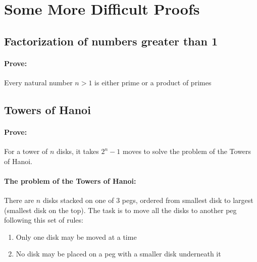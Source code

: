 \documentclass[12pt]{article}
\begin{document}
	\section{Some More Difficult Proofs}
		\subsection{Factorization of numbers greater than 1}
		\paragraph{Prove:} Every natural number $n>1$ is either prime or a product of primes
		\subsection{Towers of Hanoi}
		\paragraph{Prove:} For a tower of $n$ disks, it takes $2^n-1$ moves to solve the problem of the Towers of Hanoi.\newline
		\paragraph{The problem of the Towers of Hanoi:} There are $n$ disks stacked on one of 3 pegs, ordered from smallest disk to largest (smallest disk on the top). The task is to move all the disks to another peg following this set of rules:
		\begin{enumerate}
			\item Only one disk may be moved at a time
			\item No disk may be placed on a peg with a smaller disk underneath it
		\end{enumerate}
\end{document}
